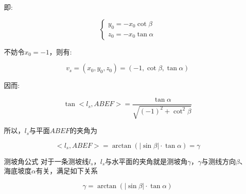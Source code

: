 即:

\begin{equation*}
    \begin{cases}
        y_0 = -x_0 \cot \beta \\
        z_0 = -x_0 \tan \alpha
    \end{cases}
\end{equation*}

不妨令$x_0 = -1$，则有:

\begin{equation}
    v_s 
    = (x_0, y_0, z_0)
    = \left( 
            -1,
            \cot \beta,
            \tan \alpha
      \right)
\end{equation}

因而:

\begin{equation*}
    \tan <l_s, ABEF> 
    = \frac {\tan \alpha} {\sqrt{(-1)^2 + \cot ^2 \beta}}
\end{equation*}

所以，$l_s$与平面$ABEF$的夹角为

\begin{equation}
    <l_s, ABEF> 
    = \arctan \left(|\sin \beta| \cdot  \tan \alpha\right)
    = \gamma
\end{equation}

\begin{mcmTheorem}{测坡角公式}
    \label{theorem:测坡角公式}
    对于一条测坡线$l_s$，$l_s$与水平面的夹角就是测坡角$\gamma$，$\gamma$与测线方向$\beta$、海底坡度$\alpha$有关，满足如下关系

    \begin{equation}
        \gamma = \arctan(|\sin\beta| \cdot \tan\alpha)
    \end{equation}
\end{mcmTheorem}

